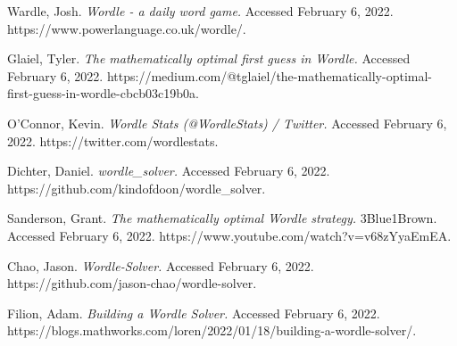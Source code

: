 \documentclass[twocolumn]{tudelft-aiaa}
\begin{document}
\begin{thebibliography}{9}

Wardle, Josh. \emph{Wordle - a daily word game.} Accessed February 6, 2022. https://www.powerlanguage.co.uk/wordle/.

Glaiel, Tyler. \emph{The mathematically optimal first guess in Wordle.} Accessed February 6, 2022. https://medium.com/@tglaiel/the-mathematically-optimal-first-guess-in-wordle-cbcb03c19b0a.

O'Connor, Kevin. \emph{Wordle Stats (@WordleStats) / Twitter.} Accessed February 6, 2022. https://twitter.com/wordlestats.

Dichter, Daniel. \emph{wordle\_solver.} Accessed February 6, 2022. https://github.com/kindofdoon/wordle\_solver.

Sanderson, Grant. \emph{The mathematically optimal Wordle strategy.} 3Blue1Brown. Accessed February 6, 2022. https://www.youtube.com/watch?v=v68zYyaEmEA.

Chao, Jason. \emph{Wordle-Solver.} Accessed February 6, 2022. https://github.com/jason-chao/wordle-solver.

Filion, Adam. \emph{Building a Wordle Solver.} Accessed February 6, 2022. https://blogs.mathworks.com/loren/2022/01/18/building-a-wordle-solver/.

\end{thebibliography}
\end{document}
